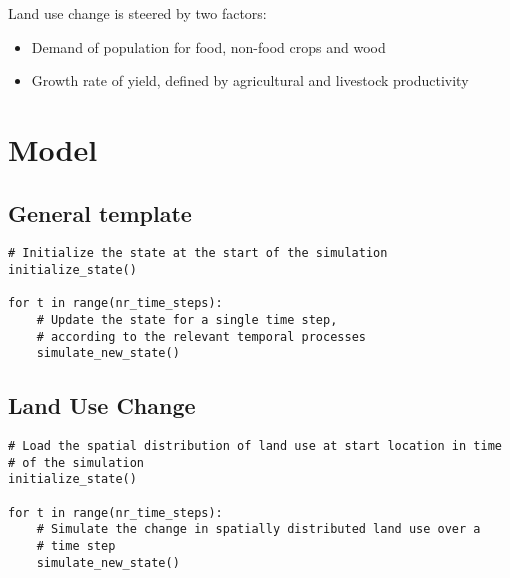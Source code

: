 \documentclass[a4paper,12pt]{article}
\begin{document}
Land use change is steered by two factors:
\begin{itemize}
    \item Demand of population for food, non-food crops and wood
    \item Growth rate of yield, defined by agricultural and livestock
        productivity
\end{itemize}


\section{Model}
\subsection{General template}
\begin{lstlisting}
# Initialize the state at the start of the simulation
initialize_state()

for t in range(nr_time_steps):
    # Update the state for a single time step,
    # according to the relevant temporal processes
    simulate_new_state()
\end{lstlisting}


\subsection{Land Use Change}
\begin{lstlisting}
# Load the spatial distribution of land use at start location in time
# of the simulation
initialize_state()

for t in range(nr_time_steps):
    # Simulate the change in spatially distributed land use over a
    # time step
    simulate_new_state()
\end{lstlisting}
\end{document}
